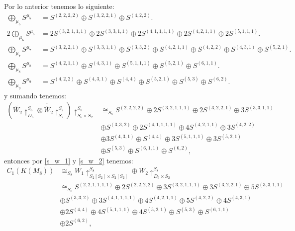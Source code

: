 \documentclass[12pt]{book}
\theoremstyle{definition}
\newcounter{in}
\begin{document}
Por lo anterior tenemos lo siguiente:
\begin{equation}
\begin{aligned}
\bigoplus_{\mu_{5}} S^{\mu_{5}} & = S^{(2, 2, 2, 2)} \oplus S^{(3, 2, 2, 1)} \oplus S^{(4, 2, 2)}. \\
2 \bigoplus_{\mu_{6}} S^{\mu_{6}} & = 2S^{(3, 2, 1, 1, 1)} \oplus 2S^{(3, 3, 1, 1)} \oplus 2S^{(4, 1, 1, 1, 1)} \oplus 2S^{(4, 2, 1, 1)} \oplus 2S^{(5, 1, 1, 1)}. \\
\bigoplus_{\mu_{7}} S^{\mu_{7}} & = S^{(3, 2, 2, 1)} \oplus S^{(3, 3, 1, 1)} \oplus S^{(3, 3, 2)} \oplus S^{(4, 2, 1, 1)} \oplus S^{(4, 2, 2)} \oplus S^{(4, 3, 1)} \oplus S^{(5, 2, 1)}. \\
\bigoplus_{\mu_{8}} S^{\mu_{8}} & = S^{(4, 2, 1, 1)} \oplus S^{(4, 3, 1)} \oplus S^{(5, 1, 1, 1)} \oplus S^{(5, 2, 1)} \oplus S^{(6, 1, 1)}. \\
\bigoplus_{\mu_{9}} S^{\mu_{9}} & = S^{(4, 2, 2)} \oplus S^{(4, 3, 1)} \oplus S^{(4, 4)} \oplus S^{(5, 2, 1)} \oplus S^{(5, 3)} \oplus S^{(6, 2)}.
\end{aligned}
\end{equation}
y sumando tenemos:
\begin{equation}
\label{s_w_2}
\begin{aligned}
(\tilde{W_{2}} \uparrow_{D_{6}}^{S_{6}} \otimes \tilde{\tilde{W_{2}}} \uparrow_{S_{2}}^{S_{2}}) \uparrow_{S_{6}\times S_{2}}^{S_{8}} & \cong_{S_{8}} S^{(2, 2, 2, 2)} \oplus 2S^{(3, 2, 1, 1, 1)} \oplus 2S^{(3, 2, 2, 1)} \oplus 3S^{(3, 3, 1, 1)}\\
& \oplus S^{(3, 3, 2)} \oplus 2S^{(4, 1, 1, 1, 1)} \oplus 4S^{(4, 2, 1, 1)} \oplus 3S^{(4, 2, 2)}\\
& \oplus 3S^{(4, 3, 1)} \oplus S^{(4, 4)} \oplus 3S^{(5, 1, 1, 1)} \oplus 3S^{(5, 2, 1)} \\
&\oplus S^{(5, 3)} \oplus S^{(6, 1, 1)} \oplus S^{(6, 2)},
\end{aligned}
\end{equation}
entonces por \ref{s_w_1} y \ref{s_w_2} tenemos:
\begin{equation}
\begin{aligned}
C_{1}(K(M_{8})) & \cong_{S_{8}} W_{1} \uparrow_{S_{2} \left [ S_{2} \right ] \times S_{2} \left [ S_{2} \right ]}^{S_{8}} \oplus W_{2} \uparrow_{D_{6} \times S_{2}}^{S_{8}}\\
& \cong_{S_{8}} S^{(2, 2, 1, 1, 1, 1)} \oplus 2S^{(2, 2, 2, 2)} \oplus 3S^{(3, 2, 1, 1, 1)} \oplus 3S^{(3, 2, 2, 1)} \oplus 5S^{(3, 3, 1, 1)} \\
& \oplus S^{(3, 3, 2)} \oplus 3S^{(4, 1, 1, 1, 1)} \oplus 4S^{(4, 2, 1, 1)} \oplus 5S^{(4, 2, 2)} \oplus 4S^{(4, 3, 1)} \\
& \oplus 2S^{(4, 4)} \oplus 4S^{(5, 1, 1, 1)} \oplus 4S^{(5, 2, 1)} \oplus S^{(5, 3)} \oplus S^{(6, 1, 1)}\\
& \oplus 2S^{(6, 2)},
\end{aligned}
\end{equation}
\end{document}
